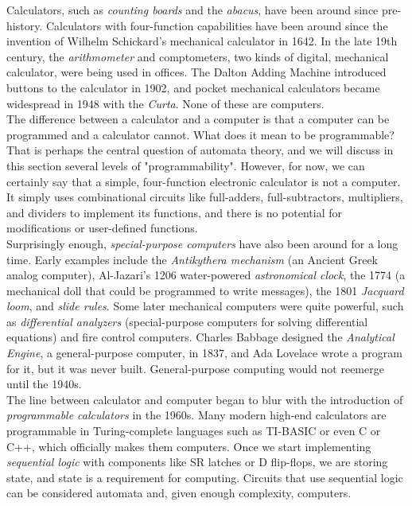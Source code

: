 Calculators, such as \textit{counting boards} and the \textit{abacus}, have been around since pre-history. Calculators with four-function capabilities have been around since the invention of Wilhelm Schickard's mechanical calculator in 1642. In the late 19th century, the \textit{arithmometer} and comptometers, two kinds of digital, mechanical calculator, were being used in offices. The Dalton Adding Machine introduced buttons to the calculator in 1902, and pocket mechanical calculators became widespread in 1948 with the \textit{Curta}. None of these are computers. \\

The difference between a calculator and a computer is that a computer can be programmed and a calculator cannot. What does it mean to be programmable? That is perhaps the central question of automata theory, and we will discuss in this section several levels of "programmability". However, for now, we can certainly say that a simple, four-function electronic calculator is not a computer. It simply uses combinational circuits like full-adders, full-subtractors, multipliers, and dividers to implement its functions, and there is no potential for modifications or user-defined functions. \\

Surprisingly enough, \textit{special-purpose computers} have also been around for a long time. Early examples include the \textit{Antikythera mechanism} (an Ancient Greek analog computer), Al-Jazari's 1206 water-powered \textit{astronomical clock}, the 1774  (a mechanical doll that could be programmed to write messages), the 1801 \textit{Jacquard loom}, and \textit{slide rules}. Some later mechanical computers were quite powerful, such as \textit{differential analyzers} (special-purpose computers for solving differential equations) and fire control computers. Charles Babbage designed the \textit{Analytical Engine}, a general-purpose computer, in 1837, and Ada Lovelace wrote a program for it, but it was never built. General-purpose computing would not reemerge until the 1940s. \\

The line between calculator and computer began to blur with the introduction of \textit{programmable calculators} in the 1960s. Many modern high-end calculators are programmable in Turing-complete languages such as TI-BASIC or even C or C++, which officially makes them computers. Once we start implementing \textit{sequential logic} with components like SR latches or D flip-flops, we are storing state, and state is a requirement for computing. Circuits that use sequential logic can be considered automata and, given enough complexity, computers. \\

